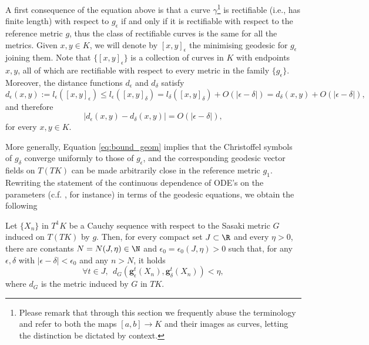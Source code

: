 \documentclass[reqno,11pt]{amsart}
\begin{document}
A first consequence of the equation above is that a curve \( \gamma \)\footnote{
    Please remark that through this section we frequently abuse the terminology and refer to both the maps \( [a,b] \to K \) and their images as curves, letting the distinction be dictated by context. 
} is rectifiable (i.e., has finite length) with respect to \( g_\epsilon \) if and only if it is rectifiable with respect to the reference metric \( g \), thus the class of rectifiable curves is the same for all the metrics.
Given \( x,y \in K \), we will denote by \(  [x,y]_\epsilon  \) the minimising geodesic for \(  g_\epsilon  \) joining them.
Note that \( \{[x,y]_\epsilon\} \) is a collection of curves in \( K \) with endpoints \( x,y \), all of which are rectifiable with respect to every metric in the family \( \{g_\epsilon\} \).
Moreover, the distance functions \(  d_\epsilon  \) and \(  d_{\delta}  \) satisfy
\[
    d_\epsilon(x,y) := l_\epsilon([x,y]_\epsilon) \leq l_\epsilon([x,y]_{\delta}) = l_{\delta}([x,y]_{\delta}) + O(|\epsilon - {\delta}|) = d_{\delta}(x,y) + O(|\epsilon - {\delta}|),
\]
and therefore
\begin{equation}\label{eq:unif_conver_dist}
    |d_\epsilon(x,y) - d_{\delta}(x,y)| = O(|\epsilon - {\delta}|),
\end{equation}
for every \( x,y \in K \).
\par More generally, Equation \eqref{eq:bound_geom} implies that the Christoffel symbols of \( g_{\delta} \) converge uniformly to those of \( g_\epsilon \), and the corresponding geodesic vector fields on \( T(TK) \) can be made arbitrarily close in the reference metric \( g_1 \).
Rewriting the statement of the continuous dependence of ODE's on the parameters (c.f. \cite[Chapter 3.12]{walter2013ordinary}, for instance) in terms of the geodesic equations, we obtain the following
\begin{lemma}\label{lem:uniform_conv_geodesic_flows}
    Let \( \{X_n\} \) in \( T^1K \) be a Cauchy sequence with respect to the Sasaki metric \( G \) induced on \( T(TK) \) by \( g \).  
    Then, for every compact set \( J \subset \R \) and every \( \eta > 0 \), there are constants \( N = N(J, \eta) \in \N \) and \( \epsilon_0 = \epsilon_0(J, \eta) > 0 \) such that, for any \( \epsilon, \delta \) with \( |\epsilon-\delta| < \epsilon_0 \) and any \( n > N \), it holds
    \[
        \forall t \in J, \ \ d_G(\mathbf{g}_\epsilon^t(X_n), \mathbf{g}_{\delta}^t(X_n)) < \eta,
    \]
    where \( d_G \) is the metric induced by \( G \) in \( TK \).
\end{lemma}
\end{document}
